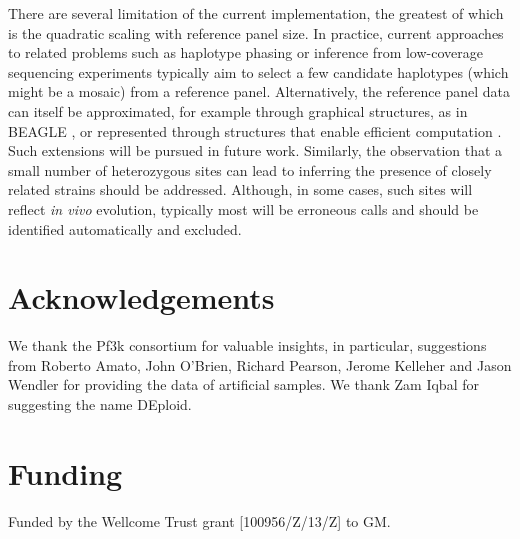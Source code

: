 \documentclass{bioinfo}
\begin{document}
There are several limitation of the current implementation, the greatest of which is the quadratic scaling with reference panel size.  In practice, current approaches to related problems such as haplotype phasing \citep{Delaneau2012} or inference from low-coverage sequencing experiments \citep{Davis2016} typically aim to select a few candidate haplotypes (which might be a mosaic) from a reference panel.  Alternatively, the reference panel data can itself be approximated, for example through graphical structures, as in BEAGLE \citep{Browning2007}, or represented through structures that enable efficient computation \citep{Lunter2016}.  Such extensions will be pursued in future work.  Similarly, the observation that a small number of heterozygous sites can lead to inferring the presence of closely related strains should be addressed. Although, in some cases, such sites will reflect {\it in vivo} evolution, typically most will be erroneous calls and should be identified automatically and excluded.





\section*{Acknowledgements}
We thank the Pf3k consortium for valuable insights, in particular, suggestions from Roberto Amato, John O'Brien, Richard Pearson, Jerome Kelleher and Jason Wendler for providing the data of artificial samples. We thank Zam Iqbal for suggesting the name DEploid.

\section*{Funding}
Funded by the Wellcome Trust grant [100956/Z/13/Z] to GM.\\
~\\
\end{document}
